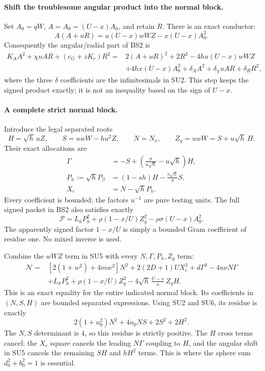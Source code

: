 \paragraph{Shift the troublesome angular product into the normal block.}
Set $A_0=qW$, $A=A_\theta=(U-x)A_0$, and retain $R$.
There is an exact conductor:
\[
 A(A+uR)=u(U-x)wWZ-x(U-x)A_0^2.
 \tag{SU4}
\]
Consequently the angular/radial part of BS2 is
\[
\begin{split}
 K_AA^2+\chi uAR+(c_G+zK_r)R^2
 ={}&2(A+uR)^2+2R^2-4hu(U-x)wWZ\\
 &+4hx(U-x)A_0^2+\delta_A A^2+
   \delta_\chi uAR+\delta_RR^2,
\end{split} \tag{SU5}
\]
where the three $\delta$ coefficients are the infinitesimals in
SU2.  This step keeps the signed product exactly; it is not an
inequality based on the sign of $U-x$.

\paragraph{A complete strict normal block.}
Introduce the legal separated roots
\[
 H=\sqrt h\,uZ,\qquad S=uwW-hu^2Z,\qquad N=N_x,
 \qquad Z_g=uwW=S+u\sqrt h\,H.
\]
Their exact allocations are
\[
\begin{split}
 \Gamma&=-S+\left(\frac{\sigma}{u\sqrt h}-u\sqrt h\right)H,\\
 P_h:=\sqrt h P_\beta&=(1-sh)H-\frac{s\sqrt h}{u}S,\\
 X_e&=N-\sqrt h P_h.
\end{split} \tag{SU6}
\]
Every coefficient is bounded; the factors $u^{-1}$ are pure testing
units.  The full signed packet in BS2 also satisfies exactly
\[
 \mathscr P=L_hP_h^2+
      \rho(1-x/U)Z_g^2-\rho\sigma(U-x)A_0^2.
 \tag{SU7}
\]
The apparently signed factor $1-x/U$ is simply a bounded Gram
coefficient of residue one.  No mixed inverse is used.

Combine the $wWZ$ term in SU5 with every $N,\Gamma,P_h,Z_g$ term:
\[
\begin{split}
 \mathscr N={}&[2(1+w^2)+4mw^2]N^2
     +2(2D+1)U X_e^2+d\Gamma^2-4u\nu N\Gamma\\
 &+L_hP_h^2+\rho(1-x/U)Z_g^2
       -4\sqrt h\,\frac{U-x}{u}\,Z_gH .
\end{split} \tag{SU8}
\]
This is an exact equality for the entire indicated normal block.
Its coefficients in $(N,S,H)$ are bounded separated expressions.
Using SU2 and SU6, its residue is exactly
\[
 2(1+u_0^2)N^2+4u_0NS+2S^2+2H^2.
 \tag{SU9}
\]
The $N,S$ determinant is $4$, so this residue is strictly positive.
The $H$ cross terms cancel: the $X_e$ square cancels the leading
$N\Gamma$ coupling to $H$, and the angular shift in SU5 cancels
the remaining $S H$ and $hH^2$ terms.  This is where the sphere
sum $d_0^2+b_0^2=1$ is essential.


